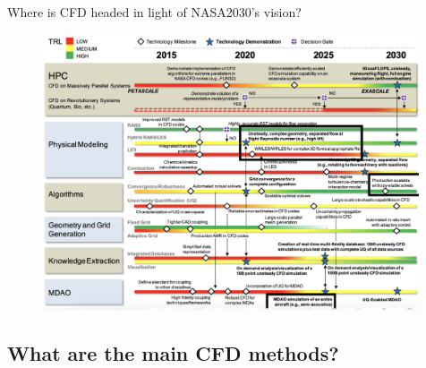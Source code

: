 \documentclass[10pt]{beamer}
\begin{document}
\begin{frame}{Where is CFD headed in light of NASA2030's vision?}
\begin{figure}
\centering
\includegraphics[width=0.99\textwidth]{figs/nasa.png}
\end{figure}
\end{frame}


\subsection{What are the main CFD methods?}
\end{document}
